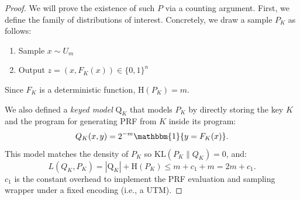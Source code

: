 \documentclass[twoside]{article}
\newcommand{\rH}{\mathrm{H}}
\begin{document}
\begin{proof}
    We will prove the existence of such $P$ via a counting argument. First, we define the family of distributions of interest. Concretely, we draw a sample $P_K$ as follows:
    \begin{enumerate}
        \item Sample $x \sim U_m$
        \item Output $z = (x, F_K(x)) \in \{0,1\}^n$
    \end{enumerate}
    Since $F_K$ is a deterministic function, $\rH(P_K) = m$.

    We also defined a \emph{keyed model} $\mathrm{Q}_K$ that models $P_K$ by directly storing the key $K$ and the program for generating PRF from $K$ inside its program:
    $$Q_K(x,y) = 2^{-m} \mathbbm{1}\{y = F_K(x)\}.$$
    This model matches the density of $P_K$ so $\mathrm{KL}(P_K \| Q_K) = 0$, and:
    $$L(Q_K, P_K) = |\mathrm{Q}_K| + \rH(P_K) \leq m + c_1 + m = 2m + c_1.$$
    $c_1$ is the constant overhead to implement the PRF evaluation and sampling wrapper under a fixed encoding (i.e., a UTM).


\end{proof}
\end{document}
